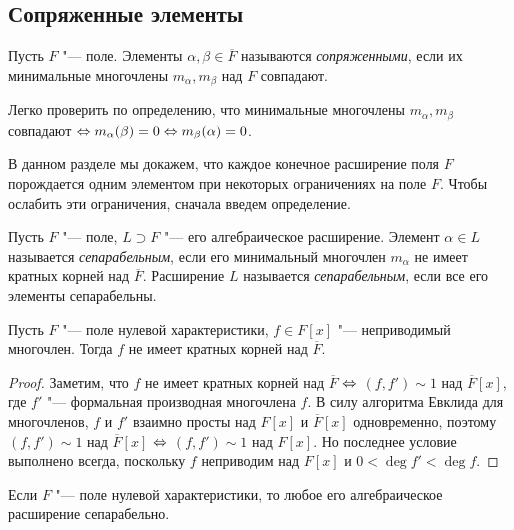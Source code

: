 \subsection{Сопряженные элементы}

\begin{definition}
	Пусть $F$ "--- поле. Элементы $\alpha, \beta \in \overline{F}$ называются \textit{сопряженными}, если их минимальные многочлены $m_\alpha, m_\beta$ над $F$ совпадают.
\end{definition}

\begin{note}
	Легко проверить по определению, что минимальные многочлены $m_\alpha, m_\beta$ совпадают $\Leftrightarrow m_\alpha(\beta) = 0 \Leftrightarrow m_\beta(\alpha) = 0$.
\end{note}

В данном разделе мы докажем, что каждое конечное расширение поля $F$ порождается одним элементом при некоторых ограничениях на поле $F$. Чтобы ослабить эти ограничения, сначала введем определение.

\begin{definition}
	Пусть $F$ "--- поле, $L \supset F$ "--- его алгебраическое расширение. Элемент $\alpha \in L$ называется \textit{сепарабельным}, если его минимальный многочлен $m_\alpha$ не имеет кратных корней над $\overline{F}$. Расширение $L$ называется \textit{сепарабельным}, если все его элементы сепарабельны.
\end{definition}

\begin{proposition}
	Пусть $F$ "--- поле нулевой характеристики, $f \in F[x]$ "--- неприводимый многочлен. Тогда $f$ не имеет кратных корней над $\overline{F}$.
\end{proposition}

\begin{proof}
	Заметим, что $f$ не имеет кратных корней над $\overline{F}$ $\Leftrightarrow$ $(f, f') \sim 1$ над $\overline{F}[x]$, где $f'$ "--- формальная производная многочлена $f$. В силу алгоритма Евклида для многочленов, $f$ и $f'$ взаимно просты над $F[x]$ и $\overline{F}[x]$ одновременно, поэтому $(f, f') \sim 1$ над $\overline{F}[x]$ $\Leftrightarrow$ $(f, f') \sim 1$ над $F[x]$. Но последнее условие выполнено всегда, поскольку $f$ неприводим над $F[x]$ и $0 < \deg{f'} < \deg{f}$.
\end{proof}

\begin{corollary}
	 Если $F$ "--- поле нулевой характеристики, то любое его алгебраическое расширение сепарабельно.
\end{corollary}

